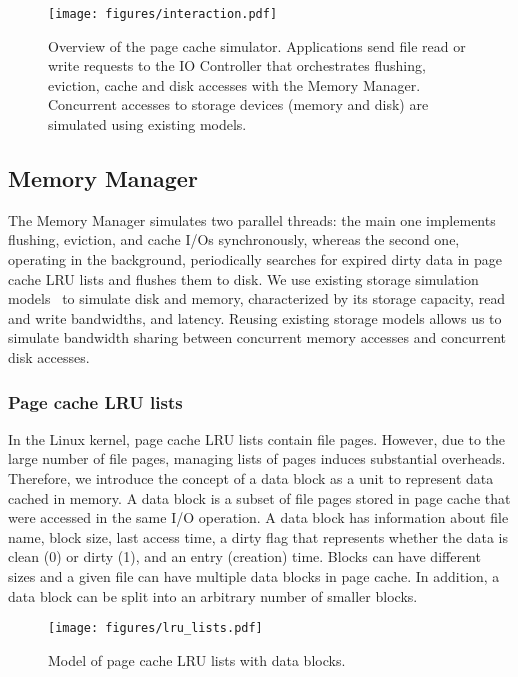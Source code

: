 \documentclass[conference]{IEEEtran}
\begin{document}
    \begin{figure}
           \centering
           \texttt{[image: figures/interaction.pdf]}
           \caption{Overview of the page cache simulator.
           Applications send file read or write requests to the
           IO Controller that orchestrates flushing, eviction, cache
           and disk accesses with the Memory Manager. Concurrent accesses to storage
           devices (memory and disk) are simulated using existing models.}
           \label{fig:interaction}
    \end{figure}

    \subsection{Memory Manager}

    The Memory Manager simulates two parallel threads: the main one
    implements flushing, eviction, and cache I/Os synchronously, whereas
    the second one, operating in the background, periodically searches for
    expired dirty data in page cache LRU lists and flushes them to disk. We
    use existing storage simulation models~\cite{lebre2015} to simulate disk and
    memory, characterized by its storage capacity, read and write
    bandwidths, and latency. Reusing existing storage models allows us to
    simulate bandwidth sharing between concurrent memory accesses and concurrent disk accesses.

    \subsubsection{Page cache LRU lists}

    In the Linux kernel, page cache LRU lists contain file pages. However, 
    due to the large number of file pages, managing lists of pages 
    induces substantial overheads.
    Therefore, we introduce the concept of a data block as a unit to represent data 
    cached in memory. A data block is a subset of file pages stored in
    page cache that were accessed in the same I/O operation. 
    A data block has information about file name, block size, last access 
    time, a dirty flag that represents whether the data is clean (0) 
    or dirty (1), and an entry (creation) time.
    Blocks can have different sizes and a given file can have multiple 
    data blocks in page cache. In addition, a data block can be split into an 
    arbitrary number of smaller blocks.
    \begin{figure}
           \centering
           \texttt{[image: figures/lru\_lists.pdf]}
           \caption{Model of page cache LRU lists with data blocks.}    \label{fig:lrulist}
    \end{figure}    
    
\end{document}
